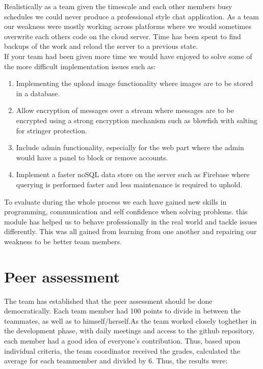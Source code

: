 \documentclass{article}
\begin{document}
	Realistically as a team given the timescale and each other members busy schedules we could never produce a professional style chat application. As a team our weakness were mostly working across platforms where we would sometimes overwrite each others code on the cloud server. Time has been spent to find backups of the work and reload the server to a previous state.\\
	
	If your team had been given more time we would have enjoyed to solve some of the more difficult implementation issues such as:
	
	\begin{enumerate}
		\item Implementing the upload image functionality where images are to be stored in a database.
		\item Allow encryption of messages over a stream where messages are to be encrypted using a strong encryption mechanism such as blowfish with salting for stringer protection.
		\item Include admin functionality, especially for the web part where the admin would have a panel to block or remove accounts.
		\item Implement a faster noSQL data store on the server such as Firebase where querying is performed faster and less maintenance is required to uphold.
	\end{enumerate}

To evaluate during the whole process we each have gained new skills in programming, communication and self confidence when solving problems. this module has helped us to behave professionally in the real world and tackle issues differently. This was all gained from learning from one another and repairing our weakness to be better team members.

\section{Peer assessment}

The team has established that the peer assessment should be done democratically. Each team member had 100 points to divide in between the teammates, as well as to himself/herself.As the team worked closely toghether in the development phase, with daily meetings and access to the github repository, each member had a good idea of everyone's contribution. Thus, based upon individual criteria, the team coordinator received the grades, calculated the average for each teammember and divided by 6. Thus, the results were: \\
\end{document}
